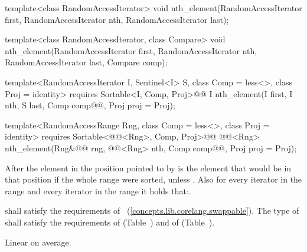 %
\begin{removedblock}
\begin{itemdecl}
template<class RandomAccessIterator>
  void nth_element(RandomAccessIterator first, RandomAccessIterator nth,
                   RandomAccessIterator last);

template<class RandomAccessIterator, class Compare>
  void nth_element(RandomAccessIterator first, RandomAccessIterator nth,
                   RandomAccessIterator last,  Compare comp);
\end{itemdecl}
\end{removedblock}
\begin{addedblock}
\begin{itemdecl}
template<RandomAccessIterator I, Sentinel<I> S, class Comp = less<>,
    class Proj = identity>
  requires Sortable<I, Comp, Proj>@\newtxt{()}@
  I nth_element(I first, I nth, S last, Comp comp@@, Proj proj = Proj{});

template<RandomAccessRange Rng, class Comp = less<>, class Proj = identity>
  requires Sortable<@@<Rng>, Comp, Proj>@\newtxt{()}@
  @@<Rng>
    nth_element(Rng&@\newtxt{\&}@ rng, @@<Rng> nth, Comp comp@@, Proj proj = Proj{});
\end{itemdecl}
\end{addedblock}

\begin{itemdescr}
\pnum
After
the element in the position pointed to by 
is the element that would be
in that position if the whole range were sorted, unless .
Also for every iterator
in the range
and every iterator
in the range
it holds that:.

\begin{removedblock}
\pnum
\requires
{} shall satisfy the requirements of
~(\ref{concepts.lib.corelang.swappable}). The type
of  shall satisfy the requirements of
 (Table~) and of
 (Table~).
\end{removedblock}

\pnum
\complexity
Linear on average.
\end{itemdescr}

